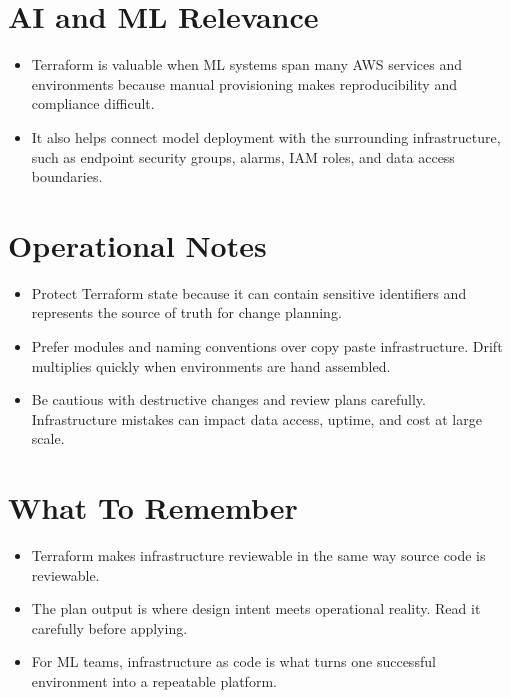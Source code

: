 \documentclass[10pt,twocolumn]{article}
\begin{document}
\section*{AI and ML Relevance}
\begin{itemize}
\item Terraform is valuable when ML systems span many AWS services and environments because manual provisioning makes reproducibility and compliance difficult.
\item It also helps connect model deployment with the surrounding infrastructure, such as endpoint security groups, alarms, IAM roles, and data access boundaries.
\end{itemize}

\section*{Operational Notes}
\begin{itemize}
\item Protect Terraform state because it can contain sensitive identifiers and represents the source of truth for change planning.
\item Prefer modules and naming conventions over copy paste infrastructure. Drift multiplies quickly when environments are hand assembled.
\item Be cautious with destructive changes and review plans carefully. Infrastructure mistakes can impact data access, uptime, and cost at large scale.
\end{itemize}

\section*{What To Remember}
\begin{itemize}
\item Terraform makes infrastructure reviewable in the same way source code is reviewable.
\item The plan output is where design intent meets operational reality. Read it carefully before applying.
\item For ML teams, infrastructure as code is what turns one successful environment into a repeatable platform.
\end{itemize}
\end{document}
